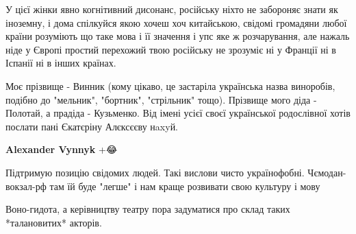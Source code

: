 \begin{itemize}
 

У цієї жінки явно когнітивний дисонанс, російську ніхто не забороняє знати як
іноземну, і дома спілкуйся якою хочеш хоч китайською, свідомі громадяни любої
країни розуміють що таке мова і її значення і упс яке ж розчарування, але
нажаль ніде у Європі простий перехожий твою російську не зрозуміє ні у Франції
ні в Іспанії ні в інших країнах.

 

Моє прізвище - Винник (кому цікаво, це застаріла українська назва виноробів,
подібно до "мельник", "бортник", "стрільник" тощо). Прізвище мого діда -
Полотай, а прадіда - Кузьменко. Від імені усієї своєї української родослівної
хотів послати пані Єкатєріну Алєксєєву нaxyй.

\begin{itemize}
 
\textbf{Alexander Vynnyk} +😂
\end{itemize}

 
Підтримую позицію свідомих людей. Такі вислови чисто українофобні. Чємодан-вокзал-рф там їй буде "легше" і нам краще розвивати свою культуру і мову

 
Воно-гидота, а керівництву театру пора задуматися про склад таких *талановитих* акторів.


\end{itemize}
